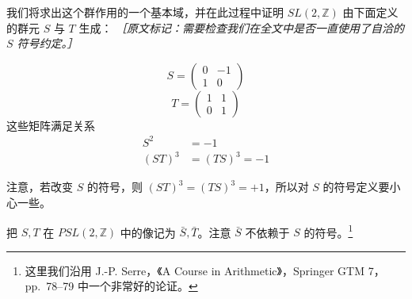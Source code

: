 我们将求出这个群作用的一个基本域，并在此过程中证明 $SL(2,\mathbb{Z})$ 由下面定义的群元 $S$ 与 $T$ 生成：
{\small\itshape ［原文标记：需要检查我们在全文中是否一直使用了自洽的 $S$ 符号约定。］}

\begin{equation}
  S=\begin{pmatrix}
    0 & -1\\
    1 & 0
  \end{pmatrix}
  \tag{C.2}
  \label{eq:C.2}
\end{equation}
\begin{equation}
  T=\begin{pmatrix}
    1 & 1\\
    0 & 1
  \end{pmatrix}
  \tag{C.3}
  \label{eq:C.3}
\end{equation}
这些矩阵满足关系
\begin{equation}
  \begin{aligned}
    S^2&=-1\\
    (ST)^3&=(TS)^3=-1
  \end{aligned}
  \tag{C.4}
  \label{eq:C.4}
\end{equation}

注意，若改变 $S$ 的符号，则 $(ST)^3=(TS)^3=+1$，所以对 $S$ 的符号定义要小心一些。

把 $S,T$ 在 $PSL(2,\mathbb{Z})$ 中的像记为 $\bar S,\bar T$。注意 $\bar S$ 不依赖于 $S$ 的符号。\footnote{这里我们沿用 J.-P. Serre，《A Course in Arithmetic》，Springer GTM 7，pp.~78--79 中一个非常好的论证。}

